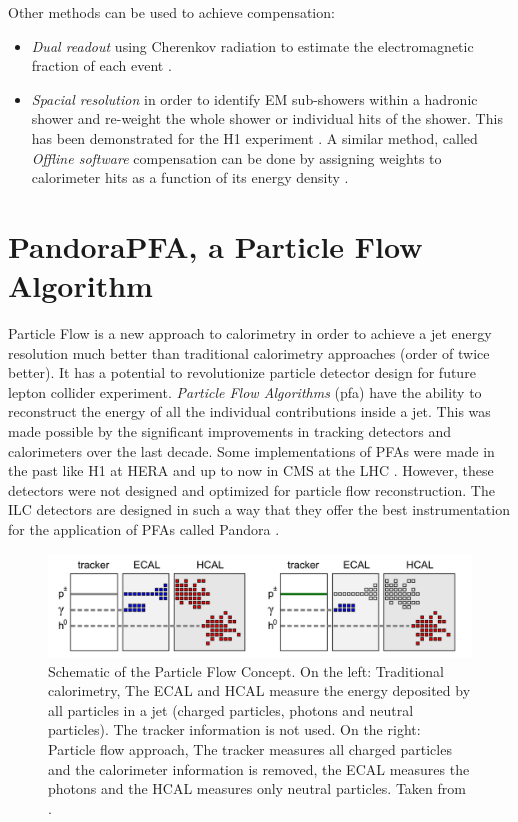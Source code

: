 Other methods can be used to achieve compensation:
\begin{itemize}
  \item \textit{Dual readout} using Cherenkov radiation to estimate the electromagnetic fraction of each event \cite{Akchurin:2013yaa}.
  \item \textit{Spacial resolution} in order to identify EM sub-showers within a hadronic shower and re-weight the whole shower or individual hits of the shower. This has been demonstrated for the H1 experiment \cite{Schacht:1990zw}. A similar method, called \textit{Offline software} compensation can be done by assigning weights to calorimeter hits as a function of its energy density \cite{SoftCompNew2012}.
\end{itemize}

\section{PandoraPFA, a Particle Flow Algorithm}
\label{sec:PFA}

Particle Flow is a new approach to calorimetry in order to achieve a jet energy resolution much better than traditional calorimetry approaches (order of twice better). It has a potential to revolutionize particle detector design for future lepton collider experiment. \textit{Particle Flow Algorithms} (\acrshort{pfa}) have the ability to reconstruct the energy of all the individual contributions inside a jet. This was made possible by the significant improvements in tracking detectors and calorimeters over the last decade. Some implementations of PFAs were made in the past like H1 at HERA \cite{Abt:1994ye} and up to now in CMS at the LHC \cite{Sirunyan:2017ulk}. However, these detectors were not designed and optimized for particle flow reconstruction. The ILC detectors are designed in such a way that they offer the best
instrumentation for the application of PFAs called Pandora \cite{Marshall2013}.

\begin{figure}[htbp!]
  \centering
  \includegraphics[width=1\linewidth]{chap2/fig/PFAConcept.png}
  \caption{Schematic of the Particle Flow Concept. On the left: Traditional calorimetry, The ECAL and HCAL measure the energy deposited by all particles in a jet (charged particles, photons and neutral particles). The tracker information is not used. On the right: Particle flow approach, The tracker measures all charged particles and the calorimeter information is removed, the ECAL measures the photons and the HCAL measures only neutral particles. Taken from \cite{Feege:2011dsa}.} \label{fig:PFAConcept}
\end{figure}

